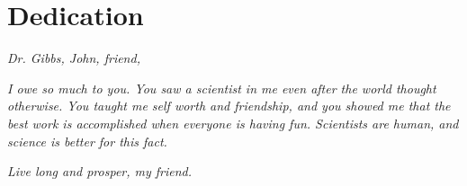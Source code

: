 \chapter*{Dedication}

\vspace{5em}

\textit{Dr. Gibbs, John, friend,}
\vspace{1em}

\textit{I owe so much to you. You saw a scientist in me even after the world thought otherwise. You taught me self worth and friendship, and you showed me that the best work is accomplished when everyone is having fun. Scientists are human, and science is better for this fact.}
\vspace{1em}

\textit{Live long and prosper, my friend.}
